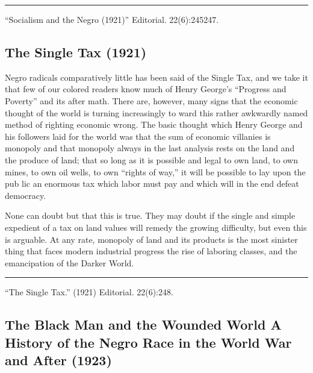 \documentclass[letterpaper,10pt,english]{jupyterBook}
\begin{document}
\bigskip\hrule\bigskip


\sphinxAtStartPar
{} “Socialism and the Negro (1921)” Editorial.  22(6):245\sphinxhyphen{}247.


\subsection{The Single Tax (1921)}
\label{\detokenize{Volumes/22/06/single_tax:the-single-tax-1921}}\label{\detokenize{Volumes/22/06/single_tax::doc}}
\sphinxAtStartPar
Negro radicals com­paratively little has been said of the Single Tax, and we take it that few of our colored readers know much of Henry George’s “Progress and Poverty” and its after­ math. There are, however, many signs that the economic thought of the world is turning increasingly to­ ward this rather awkwardly named method of righting economic wrong. The basic thought which Henry George and his followers laid for the world was that the sum of economic villanies is monopoly and that monop­oly always in the last analysis rests on the land and the produce of land; that so long as it is possible and legal to own land, to own mines, to own oil wells, to own “rights of way,” it will be possible to lay upon the pub­ lic an enormous tax which labor must pay and which will in the end defeat democracy.

\sphinxAtStartPar
None can doubt but that this is true. They may doubt if the single and simple expedient of a tax on land values will remedy the growing difficulty, but even this is arguable. At any rate, monopoly of land and its products is the most sinister thing that faces modern industrial progress the rise of laboring classes, and the emancipation of the Darker World.


\bigskip\hrule\bigskip


\sphinxAtStartPar
{} “The Single Tax.” (1921) Editorial. 22(6):248.


\subsection{The Black Man and the Wounded World \sphinxhyphen{} A History of the Negro Race in the World War and After (1923)}
\label{\detokenize{Volumes/27/03/black_man_and_the_wounded_world:the-black-man-and-the-wounded-world-a-history-of-the-negro-race-in-the-world-war-and-after-1923}}\label{\detokenize{Volumes/27/03/black_man_and_the_wounded_world::doc}}
\sphinxAtStartPar
{}
\end{document}

